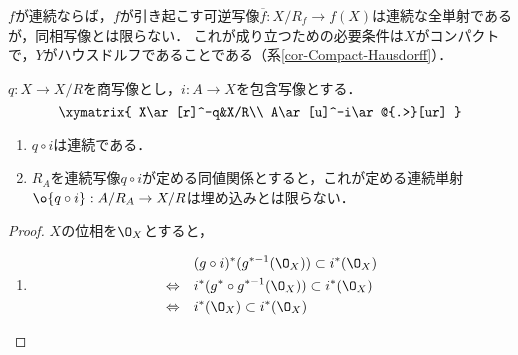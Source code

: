 \documentclass[uplatex,dvipdfmx]{jsreport}
\begin{document}
\begin{remark}[位相空間論には手放しの準同型定理はない]
    $f$が連続ならば，$f$が引き起こす可逆写像$\overline{f}:X/R_f\to f(X)$は連続な全単射であるが，同相写像とは限らない．
    これが成り立つための必要条件は$X$がコンパクトで，$Y$がハウスドルフであることである（系\ref{cor-Compact-Hausdorff}）．
\end{remark}

\begin{lemma}[部分空間との関係]
    $q:X\to X/R$を商写像とし，$i:A\to X$を包含写像とする．
    \[\xymatrix{
        X\ar[r]^-q&X/R\\
        A\ar[u]^-i\ar@{.>}[ur]
    }\]
    \begin{enumerate}
        \item $q\circ i$は連続である．
        \item $R_A$を連続写像$q\circ i$が定める同値関係とすると，これが定める連続単射$\o{q\circ i}:A/R_A\to X/R$は埋め込みとは限らない．
    \end{enumerate}
\end{lemma}
\begin{proof}
    $X$の位相を$\O_X$とすると，
    \begin{enumerate}
        \item \begin{align*}
            &(g\circ i)^*(g^{*-1}(\O_X))\subset i^*(\O_X)\\
            \Leftrightarrow\quad&i^*(g^*\circ g^{*-1}(\O_X))\subset i^*(\O_X)\\
            \Leftrightarrow\quad&i^*(\O_X)\subset i^*(\O_X)
        \end{align*}
    \end{enumerate}
\end{proof}
\end{document}
